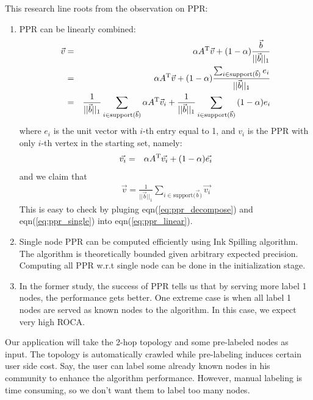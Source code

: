 \documentclass[11pt,a4paper]{article}
\begin{document}
This research line roots from the observation on PPR:
\begin{enumerate}
	\item PPR can be linearly combined:
\begin{eqnarray}
	\vec{v} &=& \alpha A^{\rm T}\vec{v}
	+ (1-\alpha)\frac{\vec{b}}{||\vec{b}||_1} \\
	&=& \alpha A^{\rm T}\vec{v}
	+ (1-\alpha)\frac{
	\sum_{i \in 
	\text{support($\vec{b}$)}}{e_i}}
	{||\vec{b}||_1} \label{eq:ppr_linear} \\
	&=& \frac{1}{{||\vec{b}||_1}}
	\sum_{i \in \text{support($\vec{b}$)}}{\alpha A^{\rm T}\vec{v}_i}
	+
	\frac{1}{{||\vec{b}||_1}}
	\sum_{i \in \text{support($\vec{b}$)}}{(1-\alpha)e_i}
\end{eqnarray}
where $e_i$ is the unit vector with $i$-th entry equal to 1, and 
$v_i$ is the PPR with only $i$-th vertex in the starting set, namely:
\begin{eqnarray}
	\vec{v_i} &=& \alpha A^{\rm T}\vec{v_i}
	+ (1-\alpha)\vec{e_i}
	\label{eq:ppr_single}
\end{eqnarray}
and we claim that 
\begin{eqnarray}
	\vec{v} = \frac{1}{{||\vec{b}||_1}} \sum_{i \in \text{support($\vec{b}$)}}{\vec{v_i}}
	\label{eq:ppr_decompose}
\end{eqnarray}
This is easy to check by pluging eqn(\ref{eq:ppr_decompose}) and eqn(\ref{eq:ppr_single})
into eqn(\ref{eq:ppr_linear}). 

\item Single node PPR can be computed efficiently using 
Ink Spilling algorithm\cite{csci5160course}. The algorithm 
is theoretically bounded given arbitrary expected precision. 
Computing all PPR w.r.t single node can be done in the initialization 
stage. 
\item In the former study, the success of PPR tells us that 
by serving more label 1 nodes, the performance gets better. One 
extreme case is when all label 1 nodes are served as known nodes 
to the algorithm. In this case, we expect very high ROCA. 
\end{enumerate}

Our application will take the 2-hop topology and some pre-labeled 
nodes as input. The topology is automatically crawled while 
pre-labeling induces certain user side cost. Say, the user 
can label some already known nodes in his community to enhance 
the algorithm performance. However, manual labeling is time consuming, 
so we don't want them to label too many nodes. 
\end{document}

